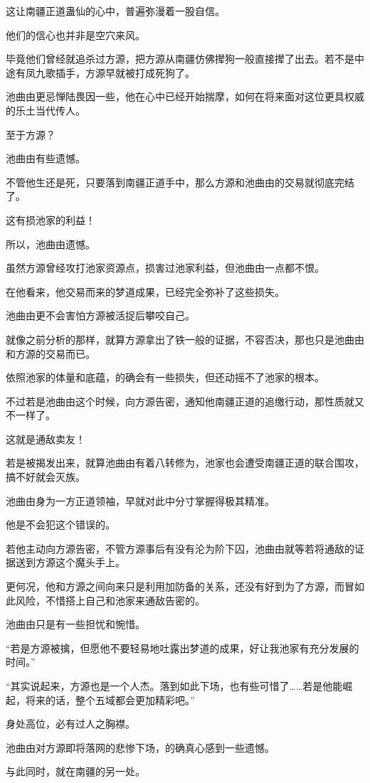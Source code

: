 \begin{this_body}
这让南疆正道蛊仙的心中，普遍弥漫着一股自信。

他们的信心也并非是空穴来风。

毕竟他们曾经就追杀过方源，把方源从南疆仿佛撵狗一般直接撵了出去。若不是中途有凤九歌插手，方源早就被打成死狗了。

池曲由更忌惮陆畏因一些，他在心中已经开始揣摩，如何在将来面对这位更具权威的乐土当代传人。

至于方源？

池曲由有些遗憾。

不管他生还是死，只要落到南疆正道手中，那么方源和池曲由的交易就彻底完结了。

这有损池家的利益！

所以，池曲由遗憾。

虽然方源曾经攻打池家资源点，损害过池家利益，但池曲由一点都不恨。

在他看来，他交易而来的梦道成果，已经完全弥补了这些损失。

池曲由更不会害怕方源被活捉后攀咬自己。

就像之前分析的那样，就算方源拿出了铁一般的证据，不容否决，那也只是池曲由和方源的交易而已。

依照池家的体量和底蕴，的确会有一些损失，但还动摇不了池家的根本。

不过若是池曲由这个时候，向方源告密，通知他南疆正道的追缴行动，那性质就又不一样了。

这就是通敌卖友！

若是被揭发出来，就算池曲由有着八转修为，池家也会遭受南疆正道的联合围攻，搞不好就会灭族。

池曲由身为一方正道领袖，早就对此中分寸掌握得极其精准。

他是不会犯这个错误的。

若他主动向方源告密，不管方源事后有没有沦为阶下囚，池曲由就等若将通敌的证据送到方源这个魔头手上。

更何况，他和方源之间向来只是利用加防备的关系，还没有好到为了方源，而冒如此风险，不惜搭上自己和池家来通敌告密的。

池曲由只是有一些担忧和惋惜。

“若是方源被擒，但愿他不要轻易地吐露出梦道的成果，好让我池家有充分发展的时间。”

“其实说起来，方源也是一个人杰。落到如此下场，也有些可惜了……若是他能崛起，将来的话，整个五域都会更加精彩吧。”

身处高位，必有过人之胸襟。

池曲由对方源即将落网的悲惨下场，的确真心感到一些遗憾。

与此同时，就在南疆的另一处。


\end{this_body}

